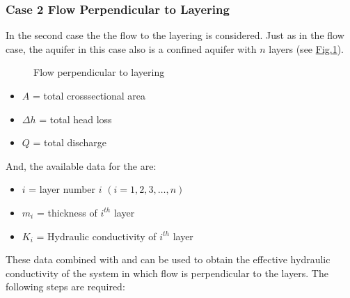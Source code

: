 \documentclass[letterpaper,10pt,english]{sphinxmanual}
\begin{document}
\subsubsection{Case 2 \sphinxhyphen{} Flow Perpendicular to Layering}
\label{\detokenize{contents/flow/lecture_05/15_het_iso:case-2-flow-perpendicular-to-layering}}
In the second case the the flow  to the layering is considered. Just as in the  flow case, the aquifer in this case also is a confined aquifer with \(n\) layers (see \hyperref[\detokenize{contents/flow/lecture_05/15_het_iso:flow-perpendicular}]{Fig.\@ \ref{\detokenize{contents/flow/lecture_05/15_het_iso:flow-perpendicular}}}).

\begin{figure}[htbp]
\centering
\capstart

\noindent{}
\caption{Flow perpendicular to layering}\label{\detokenize{contents/flow/lecture_05/15_het_iso:flow-perpendicular}}\end{figure}

\begin{itemize}
\item {} 
\(A\) = total cross\sphinxhyphen{}sectional area

\item {} 
\(\Delta h\) = total head loss

\item {} 
\(Q\) = total discharge

\end{itemize}

And, the available data for the  are:
\begin{itemize}
\item {} 
\(i\) = layer number \(i\) \((i = 1,2,3, \ldots, n)\)

\item {} 
\(m_i\) = thickness of \(i^{th}\) layer

\item {} 
\(K_i\) = Hydraulic conductivity of \(i^{th}\) layer

\end{itemize}

These data combined with  and  can be used to obtain the effective hydraulic conductivity of the system in which flow is perpendicular to the layers. The following steps are required:
\end{document}
